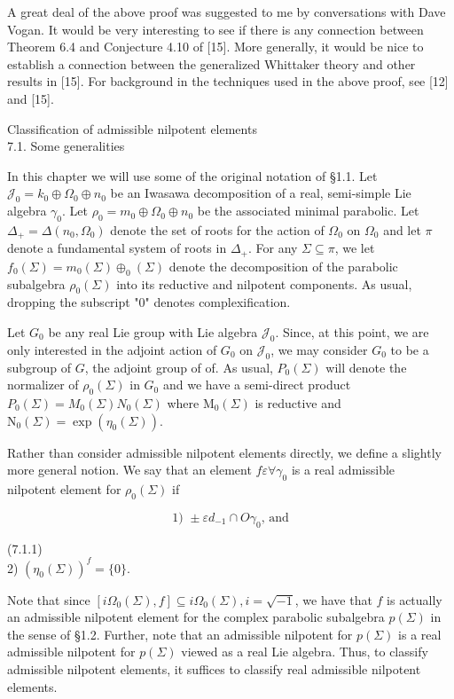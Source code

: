 \documentclass[10pt]{article}
\begin{document}
A great deal of the above proof was suggested to me by conversations with Dave Vogan. It would be very interesting to see if there is any connection between Theorem 6.4 and Conjecture 4.10 of [15]. More generally, it would be nice to establish a connection between the generalized Whittaker theory and other results in [15]. For background in the techniques used in the above proof, see [12] and [15].

Classification of admissible nilpotent elements\\
7.1. Some generalities

In this chapter we will use some of the original notation of §1.1. Let $\mathcal{J}_{0}=k_{0} \oplus \Omega_{0} \oplus n_{0}$ be an Iwasawa decomposition of a real, semi-simple Lie algebra $\gamma_{0}$. Let $\rho_{0}=m_{0} \oplus \Omega_{0} \oplus n_{0}$ be the associated minimal parabolic. Let $\Delta_{+}=\Delta\left(n_{0}, \Omega_{0}\right)$ denote the set of roots for the action of $\Omega_{0}$ on $\Omega_{0}$ and let $\pi$ denote a fundamental system of roots in $\Delta_{+}$. For any $\Sigma \subseteq \pi$, we let $f_{0}(\Sigma)=m_{0}(\Sigma) \oplus_{0}(\Sigma)$ denote the decomposition of the parabolic subalgebra $\rho_{0}(\Sigma)$ into its reductive and nilpotent components. As usual, dropping the subscript "0" denotes complexification.

Let $G_{0}$ be any real Lie group with Lie algebra $\mathcal{J}_{0}$. Since, at this point, we are only interested in the adjoint action of $G_{0}$ on $\mathcal{J}_{0}$, we may consider $G_{0}$ to be a subgroup of $G$, the adjoint group of of. As usual, $P_{0}(\Sigma)$ will denote the normalizer of $\rho_{0}(\Sigma)$ in $G_{0}$ and we have a semi-direct product $P_{0}(\Sigma)=M_{0}(\Sigma) N_{0}(\Sigma)$ where $\mathrm{M}_{0}(\Sigma)$ is reductive and $\mathrm{N}_{0}(\Sigma)=\exp \left(\eta_{0}(\Sigma)\right)$.

Rather than consider admissible nilpotent elements directly, we define a slightly more general notion. We say that an element $f \varepsilon \forall \gamma_{0}$ is a real admissible\\
nilpotent element for $\rho_{0}(\Sigma)$ if

$$
\text { 1) } \pm \varepsilon d_{-1} \cap O \gamma_{0} \text {, and }
$$

(7.1.1)\\
2) $\left(\eta_{0}(\Sigma)\right)^{f}=\{0\}$.

Note that since $\left[i \Omega_{0}(\Sigma), f\right] \subseteq i \Omega_{0}(\Sigma), i=\sqrt{-1}$, we have that $f$ is actually an admissible nilpotent element for the complex parabolic subalgebra $p(\Sigma)$ in the sense of §1.2. Further, note that an admissible nilpotent for $p(\Sigma)$ is a real admissible nilpotent for $p(\Sigma)$ viewed as a real Lie algebra. Thus, to classify admissible nilpotent elements, it suffices to classify real admissible nilpotent elements.
\end{document}
